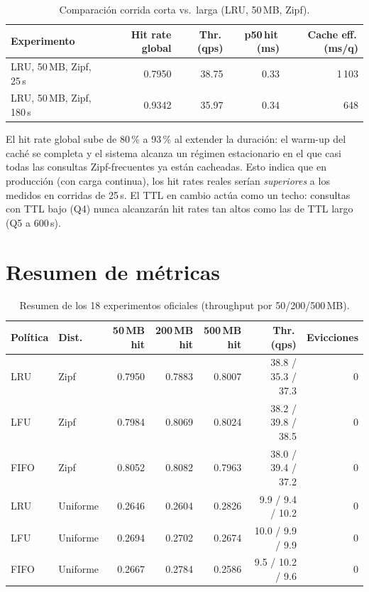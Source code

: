 \documentclass[11pt,a4paper]{article}
\begin{document}
\begin{table}[h]
\centering\small
\begin{tabular}{lrrrr}
\toprule
\textbf{Experimento} & \textbf{Hit rate global} & \textbf{Thr.\,(qps)} &
\textbf{p50\,hit\,(ms)} & \textbf{Cache eff.\,(ms/q)} \\
\midrule
LRU, 50\,MB, Zipf, 25\,s  & 0.7950 & 38.75 & 0.33 & 1\,103 \\
LRU, 50\,MB, Zipf, 180\,s & 0.9342 & 35.97 & 0.34 & \phantom{1\,}648 \\
\bottomrule
\end{tabular}
\caption{Comparación corrida corta vs.\ larga (LRU, 50\,MB, Zipf).}
\label{tab:long}
\end{table}

El hit rate global sube de 80\,\% a 93\,\% al extender la duración: el
warm-up del caché se completa y el sistema alcanza un régimen estacionario
en el que casi todas las consultas Zipf-frecuentes ya están cacheadas.
Esto indica que en producción (con carga continua), los hit rates reales
serían \emph{superiores} a los medidos en corridas de 25\,s. El TTL en
cambio actúa como un techo: consultas con TTL bajo (Q4) nunca alcanzarán
hit rates tan altos como las de TTL largo (Q5 a 600\,s).

\section{Resumen de métricas}

\begin{table}[h]
\centering\scriptsize
\begin{tabular}{llrrrrr}
\toprule
\textbf{Política} & \textbf{Dist.} & \textbf{50\,MB hit} & \textbf{200\,MB hit} &
\textbf{500\,MB hit} & \textbf{Thr.\,(qps)} & \textbf{Evicciones} \\
\midrule
LRU  & Zipf    & 0.7950 & 0.7883 & 0.8007 & 38.8 / 35.3 / 37.3 & 0 \\
LFU  & Zipf    & 0.7984 & 0.8069 & 0.8024 & 38.2 / 39.8 / 38.5 & 0 \\
FIFO & Zipf    & 0.8052 & 0.8082 & 0.7963 & 38.0 / 39.4 / 37.2 & 0 \\
LRU  & Uniforme & 0.2646 & 0.2604 & 0.2826 &  9.9 /  9.4 / 10.2 & 0 \\
LFU  & Uniforme & 0.2694 & 0.2702 & 0.2674 & 10.0 /  9.9 /  9.9 & 0 \\
FIFO & Uniforme & 0.2667 & 0.2784 & 0.2586 &  9.5 / 10.2 /  9.6 & 0 \\
\bottomrule
\end{tabular}
\caption{Resumen de los 18 experimentos oficiales (throughput por
50/200/500\,MB).}\label{tab:all}
\end{table}
\end{document}

